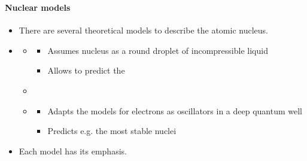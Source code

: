 \begin{frame}
\frametitle{\texorpdfstring{\culine[\sectiontitleulinecolor]{\sectiontitle}}{\sectiontitle} }
\framesubtitle{Nuclear models}

\begin{itemize}[itemsep=1.7mm]
	\item There are several theoretical models to describe the atomic nucleus. 
\item[] \begin{itemize}
	\item {}
\begin{itemize}
	\item Assumes nucleus as a round droplet of incompressible liquid
\item Allows to predict the 
\end{itemize}

\item {}
\item[] \begin{itemize}
	\item Adapts the models for electrons as oscillators in a deep quantum well
\item Predicts e.g. the most stable nuclei
\end{itemize}

\end{itemize}

\item Each model has its emphasis.  
\end{itemize}


\endofslide 
\end{frame}

